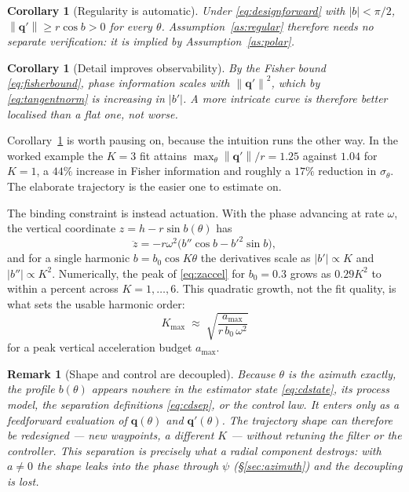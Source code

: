 \documentclass[11pt,a4paper]{article}
\newtheorem{corollary}[proposition]{Corollary}
\newtheorem{remark}{Remark}
\newcommand{\q}{\bm{q}}
\newcommand{\norm}[1]{\left\lVert#1\right\rVert}
\begin{document}
\begin{corollary}[Regularity is automatic]
\label{cor:regularity}
Under \eqref{eq:designforward} with $|b|<\pi/2$, $\norm{\q'} \ge r\cos b > 0$
for every $\theta$. Assumption~\ref{as:regular} therefore needs no separate
verification: it is implied by Assumption~\ref{as:polar}.
\end{corollary}

\begin{corollary}[Detail improves observability]
\label{cor:detailhelps}
By the Fisher bound \eqref{eq:fisherbound}, phase information scales with
$\norm{\q'}^2$, which by \eqref{eq:tangentnorm} is \emph{increasing} in
$|b'|$. A more intricate curve is therefore better localised than a flat one,
not worse.
\end{corollary}

Corollary~\ref{cor:detailhelps} is worth pausing on, because the intuition runs
the other way. In the worked example the $K=3$ fit attains
$\max_\theta\norm{\q'}/r = 1.25$ against $1.04$ for $K=1$, a $44\%$ increase in
Fisher information and roughly a $17\%$ reduction in $\sigma_\theta$. The
elaborate trajectory is the easier one to estimate on.

The binding constraint is instead actuation. With the phase advancing at rate
$\omega$, the vertical coordinate $z = h - r\sin b(\theta)$ has
\begin{equation}
\ddot z = -r\omega^2\Big(b''\cos b - b'^2\sin b\Big),
\label{eq:zaccel}
\end{equation}
and for a single harmonic $b = b_0\cos K\theta$ the derivatives scale as
$|b'|\propto K$ and $|b''|\propto K^2$. Numerically, the peak of
\eqref{eq:zaccel} for $b_0 = 0.3$ grows as $0.29K^2$ to within a percent across
$K=1,\dots,6$. This quadratic growth, not the fit quality, is what sets the
usable harmonic order:
\begin{equation}
\boxed{\ K_{\max} \;\approx\; \sqrt{\frac{a_{\max}}{r\,b_0\,\omega^2}}\ }
\label{eq:Kmax}
\end{equation}
for a peak vertical acceleration budget $a_{\max}$.

\begin{remark}[Shape and control are decoupled]
\label{rem:decoupled}
Because $\theta$ is the azimuth exactly, the profile $b(\theta)$ appears
\emph{nowhere} in the estimator state \eqref{eq:cdstate}, its process model, the
separation definitions \eqref{eq:cdsep}, or the control law. It enters only as
a feedforward evaluation of $\q(\theta)$ and $\q'(\theta)$. The trajectory
shape can therefore be redesigned --- new waypoints, a different $K$ --- without
retuning the filter or the controller. This separation is precisely what a
radial component destroys: with $a\ne0$ the shape leaks into the phase through
$\psi$ (\S\ref{sec:azimuth}) and the decoupling is lost.
\end{remark}
\end{document}
